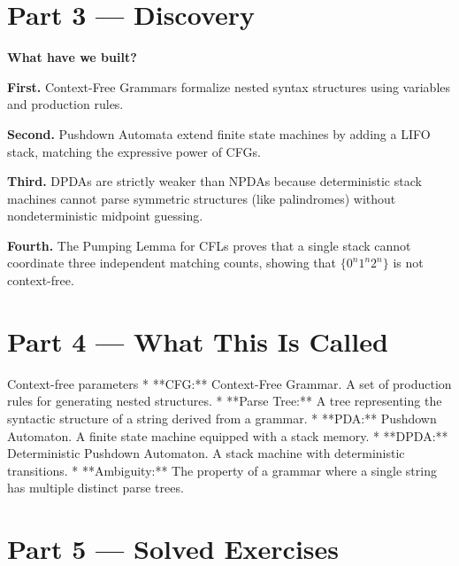 \documentclass[12pt, a4paper]{book}
\begin{document}
\newpage

\section{Part 3 --- Discovery}

\begin{discoverybox}
\textbf{What have we built?}

\textbf{First.} Context-Free Grammars formalize nested syntax structures using variables and production rules.

\textbf{Second.} Pushdown Automata extend finite state machines by adding a LIFO stack, matching the expressive power of CFGs.

\textbf{Third.} DPDAs are strictly weaker than NPDAs because deterministic stack machines cannot parse symmetric structures (like palindromes) without nondeterministic midpoint guessing.

\textbf{Fourth.} The Pumping Lemma for CFLs proves that a single stack cannot coordinate three independent matching counts, showing that $\{0^n 1^n 2^n\}$ is not context-free.
\end{discoverybox}

\newpage

\section{Part 4 --- What This Is Called}

\begin{namedconcept}{Context-free parameters}
* **CFG:** Context-Free Grammar. A set of production rules for generating nested structures.
* **Parse Tree:** A tree representing the syntactic structure of a string derived from a grammar.
* **PDA:** Pushdown Automaton. A finite state machine equipped with a stack memory.
* **DPDA:** Deterministic Pushdown Automaton. A stack machine with deterministic transitions.
* **Ambiguity:** The property of a grammar where a single string has multiple distinct parse trees.
\end{namedconcept}

\newpage

\section{Part 5 --- Solved Exercises}
\end{document}
